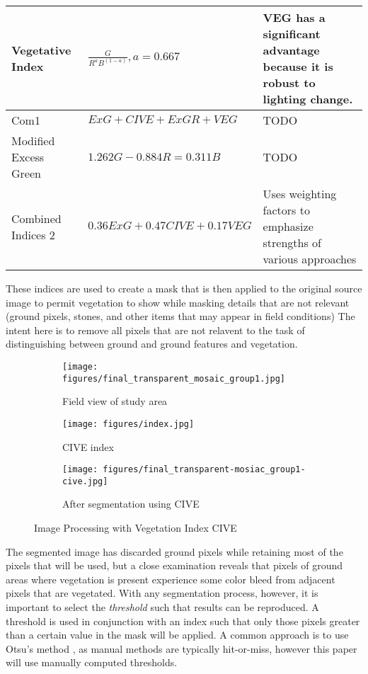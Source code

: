 \documentclass[letterpaper]{article}
\begin{document}
{\begin{table}[H]
\begin{tabular}{  l  p{4cm}  p{5cm} }
Vegetative Index      
& $\frac {G} {R^aB^{(1-a)}}, a = 0.667$ 
& VEG has a significant advantage because it is robust to lighting change.\\\hline
Com1   
& $ExG + CIVE + ExGR + VEG$ 
& TODO \\\hline
Modified Excess Green      
& $1.262G - 0.884R = 0.311B$ 
& TODO \\\hline
Combined Indices 2      
& $0.36ExG + 0.47CIVE + 0.17VEG$ 
& Uses weighting factors to emphasize strengths of various approaches\\\hline    

        \bottomrule
    \end{tabular}
\end{table}
These indices are used to create a mask that is then applied to the original source image to permit vegetation to show while masking details that are not relevant (ground pixels, stones, and other items that may appear in field conditions) The intent here is to remove all pixels that are not relavent to the task of distinguishing between ground and ground features and vegetation.
\begin{figure}[H]
\centering
\begin{subfigure}[]{.30\textwidth}
  \centering
  \texttt{[image: figures/final\_transparent\_mosaic\_group1.jpg]} 
  \caption{Field view of study area}
  \label{fig:sub1}
\end{subfigure}
\begin{subfigure}[]{.30\textwidth}
  \centering
  \texttt{[image: figures/index.jpg]} 
  \caption{CIVE index}
  \label{fig:sub2}
\end{subfigure}
\begin{subfigure}{.30\textwidth}
  \centering
  \texttt{[image: figures/final\_transparent-mosiac\_group1-cive.jpg]}
  \caption{After segmentation using CIVE}
  \label{fig:sub2}
\end{subfigure}
\caption{Image Processing with Vegetation Index CIVE}
\label{fig:segmentation}
\end{figure}
The segmented image has discarded ground pixels while retaining most of the pixels that will be used, but a close examination reveals that pixels of ground areas where vegetation is present experience some color bleed from adjacent pixels that are vegetated. With any segmentation process, however, it is important to select the {\it threshold} such that results can be reproduced. A threshold is used in conjunction with an index such that only those pixels greater than a certain value in the mask will be applied. A common approach is to use Otsu's method \cite{Otsu1979-io} , as manual methods are typically hit-or-miss, however this paper will use manually computed thresholds.
}
\end{document}
